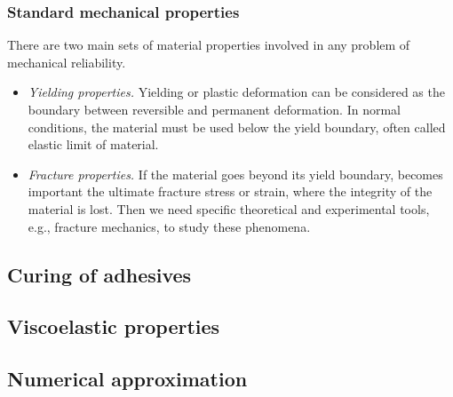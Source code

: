 \subsubsection{Standard mechanical properties}


There are two main sets of material properties involved in any problem of mechanical reliability\cite{thermosetting_polymers}.

\begin{itemize}
	\item \textit{Yielding properties.} Yielding or plastic deformation can be considered as the boundary between reversible and permanent deformation. In normal conditions, the material must be used below the yield boundary, often called elastic limit of material. 
	\item \textit{Fracture properties.} If the material goes beyond its yield boundary, becomes important the ultimate fracture stress or strain, where the integrity of the material is lost. Then we need specific theoretical and experimental tools, e.g., fracture mechanics, to study these phenomena. 
\end{itemize}



\subsection{Curing of adhesives}

\subsection{Viscoelastic properties}

\subsection{Numerical approximation}
